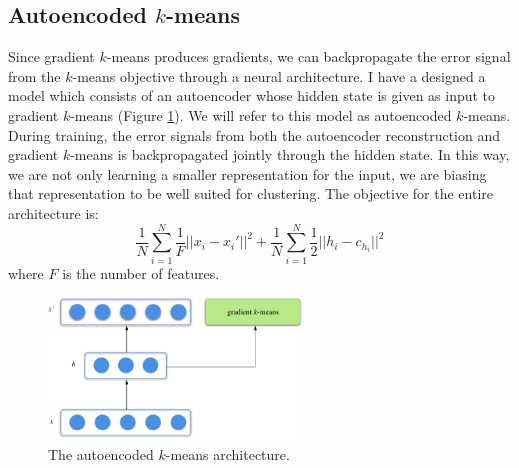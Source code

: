 \subsection{Autoencoded $k$-means}
Since gradient $k$-means produces gradients, we can backpropagate the error signal from the $k$-means objective through a neural architecture. I have a designed a  model which consists of an autoencoder whose hidden state is given as input to gradient $k$-means (Figure \ref{fig:grad_kmeans}). We will refer to this model as autoencoded $k$-means. During training, the error signals from both the autoencoder reconstruction and gradient $k$-means is backpropagated jointly through the hidden state. In this way, we are not only learning a smaller representation for the input, we are biasing that representation to be well suited for clustering. The objective for the entire architecture is: 
\begin{equation}
\frac{1}{N}\sum_{i=1}^N \frac{1}{F} ||x_i-x_i'||^2 + \frac{1}{N}\sum_{i=1}^N \frac{1}{2} ||h_i - c_{h_i}||^2
\end{equation}
where $F$ is the number of features.
\begin{figure}
	\begin{center}
		\includegraphics[width=0.6\textwidth]{figs/akm.png}
	\end{center}
	\caption{The autoencoded $k$-means architecture.}
	\label{fig:grad_kmeans}
\end{figure}
